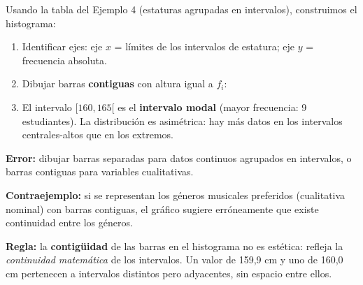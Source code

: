 \documentclass[11pt, letterpaper]{article}
\begin{document}
\begin{tcolorbox}[examplebox, title={Ej. 5. Histograma de estaturas}]
Usando la tabla del Ejemplo 4 (estaturas agrupadas en intervalos), construimos el histograma:

\begin{enumerate}[label=\textbf{\arabic*.}, leftmargin=2.8cm]
  \item[\textbf{Paso 1.}] Identificar ejes: eje $x$ = límites de los intervalos de estatura; eje $y$ = frecuencia absoluta.

  \medskip
  \item[\textbf{Paso 2.}] Dibujar barras \textbf{contiguas} con altura igual a $f_i$:

  \begin{center}
  \end{center}

  \medskip
  \item[\textbf{Conclusión.}] El intervalo $[160,165[$ es el \textbf{intervalo modal} (mayor frecuencia: 9 estudiantes). La distribución es asimétrica: hay más datos en los intervalos centrales-altos que en los extremos.
\end{enumerate}
\end{tcolorbox}

\begin{tcolorbox}[warningbox, title={Error frecuente: usar histograma para datos cualitativos (o viceversa)}]
\textbf{Error:} dibujar barras separadas para datos continuos agrupados en intervalos, o barras contiguas para variables cualitativas.

\medskip
\textbf{Contraejemplo:} si se representan los géneros musicales preferidos (cualitativa nominal) con barras contiguas, el gráfico sugiere erróneamente que existe continuidad entre los géneros.

\medskip
\textbf{Regla:} la \textbf{contigüidad} de las barras en el histograma no es estética: refleja la \textit{continuidad matemática} de los intervalos. Un valor de 159{,}9 cm y uno de 160{,}0 cm pertenecen a intervalos distintos pero adyacentes, sin espacio entre ellos.
\end{tcolorbox}
\end{document}
